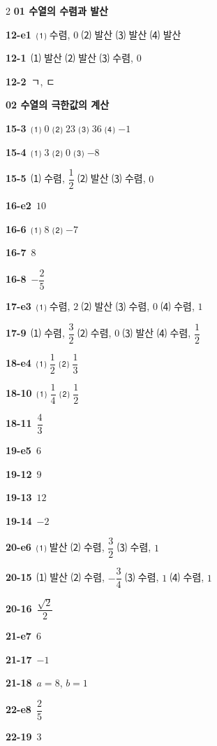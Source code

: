 \documentclass[10pt,a4paper]{article}
\begin{document}
\begin{multicols}{2}\small
\noindent\textbf{01 수열의 수렴과 발산}\par\smallskip
\noindent\textbf{12-e1}\ ⑴ 수렴, $0$ ⑵ 발산 ⑶ 발산 ⑷ 발산\par
\noindent\textbf{12-1}\ ⑴ 발산 ⑵ 발산 ⑶ 수렴, $0$\par
\noindent\textbf{12-2}\ ㄱ, ㄷ\par
\noindent\textbf{02 수열의 극한값의 계산}\par\smallskip
\noindent\textbf{15-3}\ ⑴ $0$ ⑵ $23$ ⑶ $36$ ⑷ $-1$\par
\noindent\textbf{15-4}\ ⑴ $3$ ⑵ $0$ ⑶ $-8$\par
\noindent\textbf{15-5}\ ⑴ 수렴, $\dfrac{1}{2}$ ⑵ 발산 ⑶ 수렴, $0$\par
\noindent\textbf{16-e2}\ $10$\par
\noindent\textbf{16-6}\ ⑴ $8$ ⑵ $-7$\par
\noindent\textbf{16-7}\ $8$\par
\noindent\textbf{16-8}\ $-\dfrac{2}{5}$\par
\noindent\textbf{17-e3}\ ⑴ 수렴, $2$ ⑵ 발산 ⑶ 수렴, $0$ ⑷ 수렴, $1$\par
\noindent\textbf{17-9}\ ⑴ 수렴, $\dfrac{3}{2}$ ⑵ 수렴, $0$ ⑶ 발산 ⑷ 수렴, $\dfrac{1}{2}$\par
\noindent\textbf{18-e4}\ ⑴ $\dfrac{1}{2}$ ⑵ $\dfrac{1}{3}$\par
\noindent\textbf{18-10}\ ⑴ $\dfrac{1}{4}$ ⑵ $\dfrac{1}{2}$\par
\noindent\textbf{18-11}\ $\dfrac{4}{3}$\par
\noindent\textbf{19-e5}\ $6$\par
\noindent\textbf{19-12}\ $9$\par
\noindent\textbf{19-13}\ $12$\par
\noindent\textbf{19-14}\ $-2$\par
\noindent\textbf{20-e6}\ ⑴ 발산 ⑵ 수렴, $\dfrac{3}{2}$ ⑶ 수렴, $1$\par
\noindent\textbf{20-15}\ ⑴ 발산 ⑵ 수렴, $-\dfrac{3}{4}$ ⑶ 수렴, $1$ ⑷ 수렴, $1$\par
\noindent\textbf{20-16}\ $\dfrac{\sqrt{2}}{2}$\par
\noindent\textbf{21-e7}\ $6$\par
\noindent\textbf{21-17}\ $-1$\par
\noindent\textbf{21-18}\ $a=8$, $b=1$\par
\noindent\textbf{22-e8}\ $\dfrac{2}{5}$\par
\noindent\textbf{22-19}\ $3$\par

\end{multicols}
\end{document}
